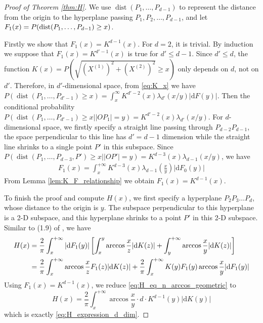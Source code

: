 \documentclass[conference,a4paper]{IEEEtran}
\DeclareMathOperator{\dist}{dist}
\def\d{\mathrm{d}}
\begin{document}
\begin{proof}[Proof of Theorem \ref{thm:H}]
     
We use $\dist(P_1,\dots, P_{d-1})$ to represent
the distance from the origin to the hyperplane passing $P_1,P_2,\dots, P_{d-1}$,
and let $F_1(x)=P(\dist(P_1,\dots, P_{d-1})\linebreak\geq x)$.


Firstly we show that $F_1(x)=K^{d-1}(x)$.
For $d=2$, it is trivial.
By induction we suppose that $F_1(x)=K^{d'-1}(x)$ is true for
$d'\leq d-1$.
Since $d'\leq d$,
the function $K(x)=P(\sqrt{(X^{(1)})^2 + (X^{(2)})^2} \geq x)$
only depends on $d$,
not on $d'$.
Therefore, in $d'$-dimensional space,
from \eqref{eq:K_x} we have $
P(\dist(P_1, \dots, P_{d'-1})\geq x) = \int_{x}^{\infty} K^{d'-2}(x)\lambda_{d'}(x/y)|\d F(y)|
$.
Then the conditional probability $P(\dist(P_1,\dots, P_{d'-1})\geq x \Big\vert |OP_1|=y)
=K^{d'-2}(x)\lambda_{d'}(x/y)$.
For $d$-dimensional space, 
we firstly specify a straight line passing through $P_{d-2}P_{d-1}$,
the space perpendicular 
to this line has $d'=d-1$ dimension while the straight line shrinks to a single point $P'$
in this subspace. Since
$P(\dist(P_1,\dots,P_{d-3},P')\geq x \Big\vert |OP'|=y)=
K^{d-3}(x)\lambda_{d-1}(x/y)$,
we have
\begin{align*}
    F_1(x) = \int_x^{+\infty} K^{d-3}(x) \lambda_{d-1}(\frac{x}{y})|\d F_0(y)|
\end{align*}
From Lemma \ref{lem:K_F_relationship} we obtain $F_1(x) = K^{d-1}(x)$.

To finish the proof and compute $H(x)$, we first specify a hyperplane $P_2P_3\dots P_{d}$,
whose distance to the origin is $y$. The subspace perpendicular to this hyperplane is a 2-D subspace,
and this hyperplane shrinks to a point $P'$ in this 2-D subspace.
Similar to (1.9) of \cite{carnal1970konvexe}, we have
\begin{align}\label{eq:H_eq_n_arccos_geometric}
     H(x) &= \frac{2}{\pi}\int_x^{+\infty}|\d F_1(y)|
     \left[ \int_x^y \arccos\frac{x}{z}|\d K(z)|
     +\int_y^{+\infty}\arccos\frac{x}{y} |\d K(z)|\right]\\
     &=\frac{2}{\pi}\int_x^{+\infty} \arccos\frac{x}{z}
     F_1(z)|\d K(z)|+\frac{2}{\pi}\int_{x}^{+\infty} K(y)F_1(y)\arccos\frac{x}{y}|\d F_1(y)| \notag 
 \end{align}
Using $F_1(x)=K^{d-1}(x)$,
we reduce \eqref{eq:H_eq_n_arccos_geometric} to
 $$
 H(x) = \frac{2}{\pi}\int_x^{+\infty}  \arccos\frac{x}{y}\cdot
 d\cdot  K^{d-1}(y) |\d K(y)|
 $$
 which is exactly \eqref{eq:H_expression_d_dim}.
 
\end{proof}
\end{document}
